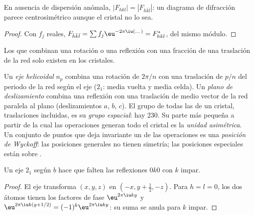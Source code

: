 \begin{proposition}\label{prop:b3:x-ray-diffraction:friedel}
En ausencia de dispersión anómala, $|F_{hkl}| = |F_{\bar h\bar k\bar l}|$: un diagrama de difracción
parece centrosimétrico aunque el cristal no lo sea.
\end{proposition}

\begin{proof}
Con $f_j$ reales, $F_{\bar h\bar k\bar l} = \sum f_j\eu^{-2\pi\iu(\dots)} = F_{hkl}^*$, del mismo
módulo.
\end{proof}

Los  que combinan una rotación o una reflexión con una fracción de una
traslación de la red solo existen en los cristales.

\begin{definition}\label{def:b3:x-ray-diffraction:space-group}
Un \emph{eje helicoidal} $n_p$ combina una rotación de $2\pi/n$ con una
traslación de $p/n$ del periodo de la red según el eje ($2_1$: media vuelta y
media celda). Un \emph{plano de deslizamiento} combina una reflexión con una
traslación de medio vector de la red paralela al plano (deslizamientos $a$, $b$, $c$).
El grupo de todas las  de un cristal, traslaciones incluidas,
es su \emph{grupo espacial}: hay 230. Su parte más pequeña
a partir de la cual las operaciones generan todo el cristal es la
\emph{unidad asimétrica}. Un conjunto de puntos que
deja invariante un  de las operaciones es una \emph{posición de
Wyckoff}: las posiciones generales no tienen simetría; las posiciones
especiales están sobre .
\end{definition}

\begin{proposition}\label{prop:b3:x-ray-diffraction:screw-absence}
Un eje $2_1$ según $b$ hace que falten las reflexiones $0k0$ con $k$ impar.
\end{proposition}

\begin{proof}
El eje transforma $(x, y, z)$ en $(-x, y + \frac12, -z)$. Para $h = l = 0$, los dos átomos tienen
los factores de fase $\eu^{2\pi\iu ky}$ y $\eu^{2\pi\iu k(y + 1/2)} = (-1)^k\eu^{2\pi\iu ky}$: su suma
se anula para $k$ impar.
\end{proof}

